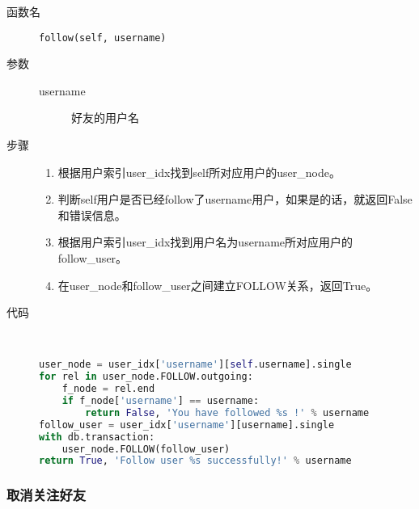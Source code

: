 \documentclass{yaldc}
\begin{document}
\begin{description}
    \item[函数名] \verb|follow(self, username)|
    \item[参数]
        \begin{description}
            \item[username] 好友的用户名
        \end{description}
    \item[步骤]
        \begin{enumerate}
            \item 根据用户索引user\_idx找到self所对应用户的user\_node。
            \item 判断self用户是否已经follow了username用户，如果是的话，就返回False和错误信息。
            \item 根据用户索引user\_idx找到用户名为username所对应用户的follow\_user。
            \item 在user\_node和follow\_user之间建立FOLLOW关系，返回True。
        \end{enumerate}
    \item[代码] ~
        \begin{lstlisting}[language=Python]
user_node = user_idx['username'][self.username].single
for rel in user_node.FOLLOW.outgoing:
    f_node = rel.end
    if f_node['username'] == username:
        return False, 'You have followed %s !' % username
follow_user = user_idx['username'][username].single
with db.transaction:
    user_node.FOLLOW(follow_user)
return True, 'Follow user %s successfully!' % username
        \end{lstlisting}
\end{description}

\subsubsection{取消关注好友}
\end{document}
